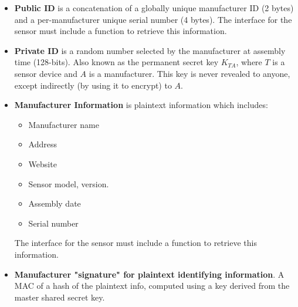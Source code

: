 \documentclass[10pt,a4paper]{article}
\begin{document}
\begin{itemize}
\item \textbf{Public ID} is a concatenation of a globally unique manufacturer ID (2 bytes) and a per-manufacturer unique serial number (4 bytes). The interface for the sensor must include a function to retrieve this information.
\item \textbf{Private ID} is a random number selected by the manufacturer at assembly time (128-bits). Also known as the permanent secret key $K_{TA}$, where $T$ is a sensor device and $A$ is a manufacturer. This key is never revealed to anyone, except indirectly (by using it to encrypt) to $A$.
\item \textbf{Manufacturer Information} is plaintext information which includes: 
\begin{itemize}
\item Manufacturer name
\item Address
\item Website
\item Sensor model, version.
\item Assembly date
\item Serial number
\end{itemize}
The interface for the sensor must include a function to retrieve this information.
\item \textbf{Manufacturer "signature" for plaintext identifying information}. A MAC of a hash of the plaintext info, computed using a key derived from the master shared secret key.
\end{itemize}






\end{document}

